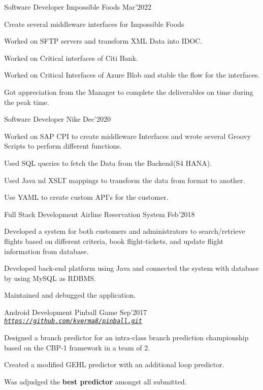 
\begin{cventries}

  \cventry
  {Software Developer}
  {Impossible Foods}
  {}
  {Mar'2022}
  {
    \begin{cvitems}
    \item Create several middleware interfaces for Impossible Foods
    \item Worked on SFTP servers and transform XML Data into IDOC.
    \item Worked on Critical interfaces of Citi Bank.
    \item Worked on Critical Interfaces of Azure Blob and stable the flow for the interfaces.
    \item Got appreciation from the Manager to complete the deliverables on time during the peak time.
    \end{cvitems}
  }

  \cventry
  {Software Developer}
  {{Nike}}
  {Dec'2020}
  {
    \begin{cvitems}
    \item Worked on SAP CPI to create middleware Interfaces and wrote several Groovy Scripts to perform different functions. 
    \item Used SQL queries to fetch the Data from the Backend(S4 HANA).
    \item Used Java nd XSLT mappings to transform the data from format to another.
    \item Use YAML to create custom API's for the customer.
    \end{cvitems}
  }

  \cventry
  {Full Stack Development}
  {{Airline Reservation System}}
  {Feb'2018}
  {}
  {
    \begin{cvitems}
    \item Developed a system for both customers and administrators to search/retrieve flights based on different criteria, book flight-tickets, and update flight information from database.
    \item Developed back-end platform using Java and connected the system with database by using MySQL as RDBMS.
    \item Maintained and debugged the application.
    \end{cvitems}
  }
  
  \cventry
  {Android Development}
  {{Pinball Game}}
  {}
  {Sep'2017}
  {\emph{\texttt{\href{https://github.com/kverma8/pinball.git}{https://github.com/kverma8/pinball.git}}}}
  {
    \begin{cvitems}
    \item Designed a branch predictor for an intra-class branch prediction
      championship based on the CBP-1 framework in a team of 2.
    \item Created a modified GEHL predictor with an additional loop predictor.
    \item Was adjudged the \textbf{best predictor} amongst all submitted.
    \end{cvitems}
  }




  
\end{cventries}
\vspace{-2mm}

